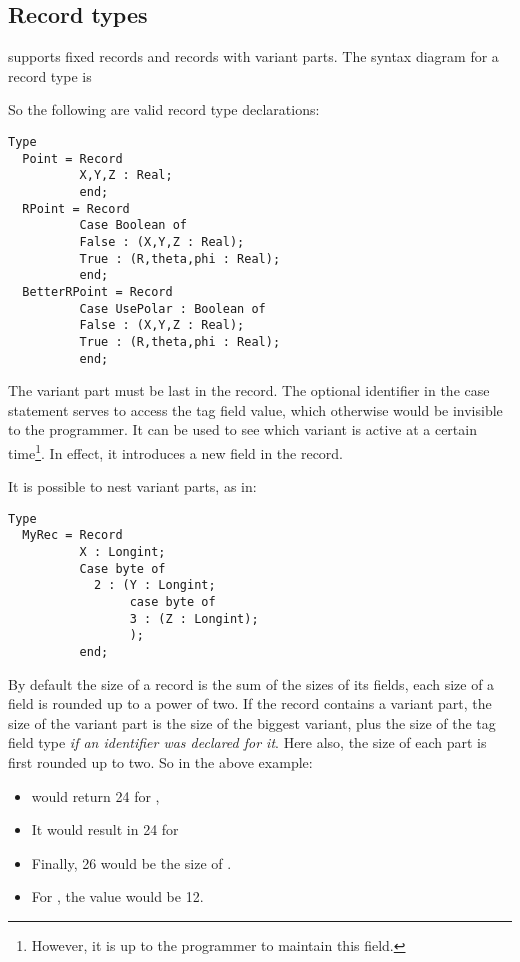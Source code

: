 \subsection{Record types}
\fpc supports fixed records and records with variant parts.
The syntax diagram for a record type is

 So the following are valid record type declarations:
\begin{verbatim}
Type
  Point = Record
          X,Y,Z : Real;
          end;
  RPoint = Record
          Case Boolean of
          False : (X,Y,Z : Real);
          True : (R,theta,phi : Real);
          end;
  BetterRPoint = Record
          Case UsePolar : Boolean of
          False : (X,Y,Z : Real);
          True : (R,theta,phi : Real);
          end;
\end{verbatim}
The variant part must be last in the record. The optional identifier in the
case statement serves to access the tag field value, which otherwise would
be invisible to the programmer. It can be used to see which variant is
active at a certain time\footnote{However, it is up to the programmer to maintain
this field.}. In effect, it introduces a new field in the record.
\begin{remark}
It is possible to nest variant parts, as in:
\begin{verbatim}
Type
  MyRec = Record
          X : Longint;
          Case byte of
            2 : (Y : Longint;
                 case byte of
                 3 : (Z : Longint);
                 );
          end;
\end{verbatim}
\end{remark}
By default the size of a record is the sum of the sizes of its fields, each size of a
field is rounded up to a power of two. If the record contains a variant part, the size
of the variant part is the size of the biggest variant, plus the size of the
tag field type {\em if an identifier was declared for it}. Here also, the size of
each part is first rounded up to two. So in the above example:
\begin{itemize}
\item {} would return 24 for , 
\item It would result in 24 for  
\item Finally, 26 would be the size of . 
\item For , the value would be 12.
\end{itemize}

